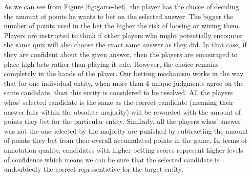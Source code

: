 As we can see from Figure \ref{fig:game-bet}, the player has the choice of deciding the amount of points he wants to bet on the selected answer. The bigger the number of points used in the bet the higher the risk of loosing or wining them. Players are instructed to think if other players who might potentially encounter the same quiz will also choose the exact same answer as they did. In that case, if they are confident about the given answer, then the players are encouraged to place high bets rather than playing it safe. However, the choice remains completely in the hands of the player. Our betting mechanism works in the way that for one individual entity, when more than 4 unique judgments agree on the same candidate, than this entity is considered to be resolved. All the players whos' selected candidate is the same as the correct candidate (meaning their answer falls within the absolute majority) will be rewarded with the amount of points they bet for the particular entity. Similarly, all the players whos' answer was not the one selected by the majority are punished by subtracting the amount of points they bet from their overall accumulated points in the game. In terms of annotation quality, candidates with higher betting scores represent higher levels of confidence which means we can be sure that the selected candidate is undoubtedly the correct representative for the target entity.